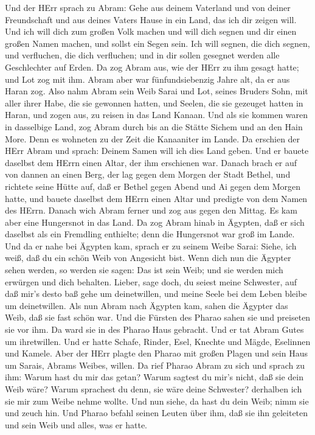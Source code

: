  Und der HErr sprach zu Abram: Gehe aus deinem Vaterland und
von deiner Freundschaft und aus deines Vaters Hause in ein Land, das ich
dir zeigen will.  Und ich will dich zum großen Volk machen
und will dich segnen und dir einen großen Namen machen, und sollst ein
Segen sein.  Ich will segnen, die dich segnen, und
verfluchen, die dich verfluchen; und in dir sollen gesegnet werden alle
Geschlechter auf Erden.  Da zog Abram aus, wie der HErr zu
ihm gesagt hatte; und Lot zog mit ihm. Abram aber war fünfundsiebenzig
Jahre alt, da er aus Haran zog.  Also nahm Abram sein Weib
Sarai und Lot, seines Bruders Sohn, mit aller ihrer Habe, die sie
gewonnen hatten, und Seelen, die sie gezeuget hatten in Haran, und zogen
aus, zu reisen in das Land Kanaan. Und als sie kommen waren in
dasselbige Land,  zog Abram durch bis an die Stätte Sichem
und an den Hain More. Denn es wohneten zu der Zeit die Kanaaniter im
Lande.  Da erschien der HErr Abram und sprach: Deinem Samen
will ich dies Land geben. Und er bauete daselbst dem HErrn einen Altar,
der ihm erschienen war.  Danach brach er auf von dannen an
einen Berg, der lag gegen dem Morgen der Stadt Bethel, und richtete
seine Hütte auf, daß er Bethel gegen Abend und Ai gegen dem Morgen
hatte, und bauete daselbst dem HErrn einen Altar und predigte von dem
Namen des HErrn.  Danach wich Abram ferner und zog aus gegen
den Mittag.  Es kam aber eine Hungersnot in das Land. Da
zog Abram hinab in Ägypten, daß er sich daselbst als ein Fremdling
enthielte; denn die Hungersnot war groß im Lande.  Und da
er nahe bei Ägypten kam, sprach er zu seinem Weibe Sarai: Siehe, ich
weiß, daß du ein schön Weib von Angesicht bist.  Wenn dich
nun die Ägypter sehen werden, so werden sie sagen: Das ist sein Weib;
und sie werden mich erwürgen und dich behalten.  Lieber,
sage doch, du seiest meine Schwester, auf daß mir's desto baß gehe um
deinetwillen, und meine Seele bei dem Leben bleibe um deinetwillen.
 Als nun Abram nach Ägypten kam, sahen die Ägypter das
Weib, daß sie fast schön war.  Und die Fürsten des Pharao
sahen sie und preiseten sie vor ihm. Da ward sie in des Pharao Haus
gebracht.  Und er tat Abram Gutes um ihretwillen. Und er
hatte Schafe, Rinder, Esel, Knechte und Mägde, Eselinnen und Kamele.
 Aber der HErr plagte den Pharao mit großen Plagen und sein
Haus um Sarais, Abrams Weibes, willen.  Da rief Pharao
Abram zu sich und sprach zu ihm: Warum hast du mir das getan? Warum
sagtest du mir's nicht, daß sie dein Weib wäre?  Warum
sprachest du denn, sie wäre deine Schwester? derhalben ich sie mir zum
Weibe nehme wollte. Und nun siehe, da hast du dein Weib; nimm sie und
zeuch hin.  Und Pharao befahl seinen Leuten über ihm, daß
sie ihn geleiteten und sein Weib und alles, was er hatte.


